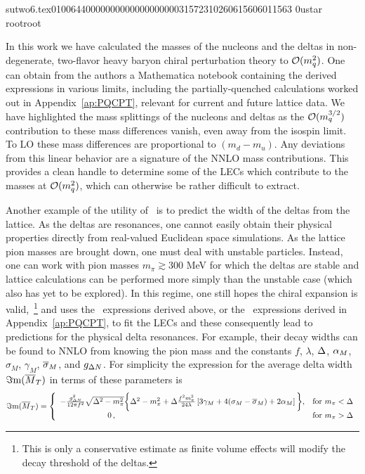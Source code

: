                                                                                                                                                                                                                                                                                       sutwo6.tex                                                                                          0100644 0000000 0000000 00000315723 10260615606 011563  0                                                                                                    ustar   root                            root                                                                                                                                                                                                                   \documentclass[prd,amssymb,amsmath,showpacs,nofootinbib,superscriptaddress]{revtex4}
\begin{document}
In this work we have calculated the masses of the nucleons and
the deltas in non-degenerate, two-flavor heavy baryon chiral
perturbation theory to ${\mathcal O} (m_q^2)$.  One can obtain from the
authors a Mathematica
notebook containing the derived expressions in various
limits, including the partially-quenched calculations worked out in Appendix~\ref{ap:PQCPT}, relevant for current and future lattice data.
We have highlighted the
mass splittings of the nucleons and deltas as the ${\mathcal O} (m_q^{3/2})$
contribution to these mass differences vanish, even away from 
the isospin limit.  To LO these mass differences are proportional to
$(m_d - m_u)$.  Any deviations from this linear behavior are a signature
of the NNLO mass contributions.  This provides a clean handle
to determine some of the LECs which contribute to the masses at ${\mathcal O}
(m_q^2)$, which can otherwise be rather difficult to extract.

Another example of the utility of \CPT\ is to predict the width of the
deltas from the lattice.  As the deltas are resonances, one cannot
easily obtain their physical properties directly from real-valued 
Euclidean space simulations.  As the lattice pion masses are brought
down, one must deal with unstable particles.  Instead, one can work
with pion masses $m_\pi \gtrsim 300$ MeV for which the deltas are
stable and lattice calculations 
can be performed more simply than the unstable case (which also has
yet to be explored). In this regime, 
one still hopes the chiral expansion is valid,~\footnote{%
This is only a conservative estimate as finite volume effects will
modify the decay threshold of the deltas.}
and uses the \CPT\ expressions derived above, or the \PQCPT\
expressions derived in Appendix~\ref{ap:PQCPT}, to fit the
LECs and these consequently lead to predictions for the physical delta
resonances. For example, their decay widths can be found to NNLO from
knowing the pion mass and the constants $f$, $\lambda$, ${\Delta}$, ${\alpha}_M$,
$\sigma_M$, $\gamma_M$, ${\overline{\sigma}}_M$, and $g_{{\Delta} N}$.  For
simplicity the expression for the average delta width $\Im \text{m}
({\overline{M}}_T)$ in terms of these parameters is 
\begin{equation}
  \Im \text{m} (\ol M_T) = \left\{
    \begin{array}{lc}
      - \frac{g_{\D N}^2}{12 \pi f^2} \sqrt{\D^2 - m_\pi^2} 
        \bigg\{ \D^2 - m_\pi^2 %
        + \D \frac{f^2 m_\pi^2 }{24 \lambda}
          \left[ 3 \gamma_M  + 4  (\sigma_M - \ol \sigma_M )  + 2 \a_M
          \right]
        \bigg\}, & \text{for } 
           m_\pi < \D \\
      \qquad\qquad\qquad 0\, , & \text{for } 
           m_\pi > \D %
    \end{array}
    \right.
\end{equation}
\end{document}
